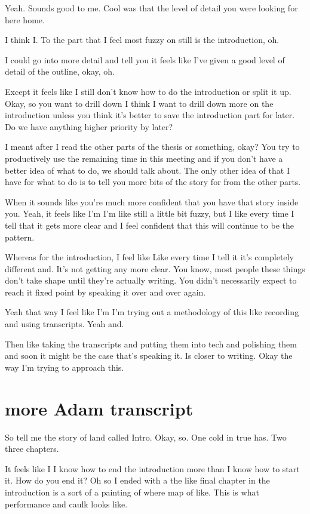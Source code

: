 \begin{subappendices}
Yeah. Sounds good to me. Cool was that the level of detail you were looking for here home. 

I think I. To the part that I feel most fuzzy on still is the introduction, oh. 

I could go into more detail and tell you it feels like I've given a good level of detail of the outline, okay, oh. 

Except it feels like I still don't know how to do the introduction or split it up. Okay, so you want to drill down I think I want to drill down more on the introduction unless you think it's better to save the introduction part for later. Do we have anything higher priority by later? 

I meant after I read the other parts of the thesis or something, okay? You try to productively use the remaining time in this meeting and if you don't have a better idea of what to do, we should talk about. The only other idea of that I have for what to do is to tell you more bits of the story for from the other parts. 

When it sounds like you're much more confident that you have that story inside you. Yeah, it feels like I'm I'm like still a little bit fuzzy, but I like every time I tell that it gets more clear and I feel confident that this will continue to be the pattern. 

Whereas for the introduction, I feel like Like every time I tell it it's completely different and. It's not getting any more clear. You know, most people these things don't take shape until they're actually writing. You didn't necessarily expect to reach it fixed point by speaking it over and over again. 

Yeah that way I feel like I'm I'm trying out a methodology of this like recording and using transcripts. Yeah and. 

Then like taking the transcripts and putting them into tech and polishing them and soon it might be the case that's speaking it. Is closer to writing. Okay the way I'm trying to approach this. 

\section{more Adam transcript}

So tell me the story of land called Intro. Okay, so. One cold in true has. Two three chapters. 

It feels like I I know how to end the introduction more than I know how to start it. How do you end it? Oh so I ended with a the like final chapter in the introduction is a sort of a painting of where map of like. This is what performance and caulk looks like. 

\end{subappendices}
